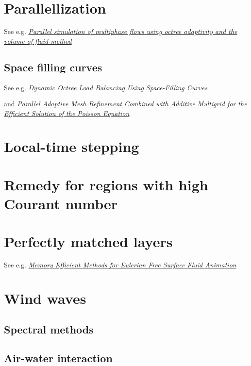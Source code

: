 \section{Parallellization}

See e.g. \textit{\href{http://gfs.sourceforge.net/papers/agbaglah2011.pdf}{Parallel simulation of multiphase flows using octree adaptivity and the volume-of-fluid method}}

\subsection{Space filling curves}

See e.g. \textit{\href{http://j.teresco.org/research/publications/octpart02/octpart02.pdf}{Dynamic Octree Load Balancing Using Space-Filling Curves}}

and \textit{\href{http://downloads.isrn.com/journals/appmath/2012/246491.pdf}{Parallel Adaptive Mesh Refinement Combined with Additive Multigrid for the Efficient Solution of the Poisson Equation}}

\section{Local-time stepping}

\section{Remedy for regions with high Courant number}

\section{Perfectly matched layers}

See e.g. \textit{\href{http://liu.diva-portal.org/smash/get/diva2:359805/FULLTEXT01}{Memory Efficient Methods for Eulerian Free Surface Fluid Animation}}

\section{Wind waves}

\subsection{Spectral methods}

\subsection{Air-water interaction}


